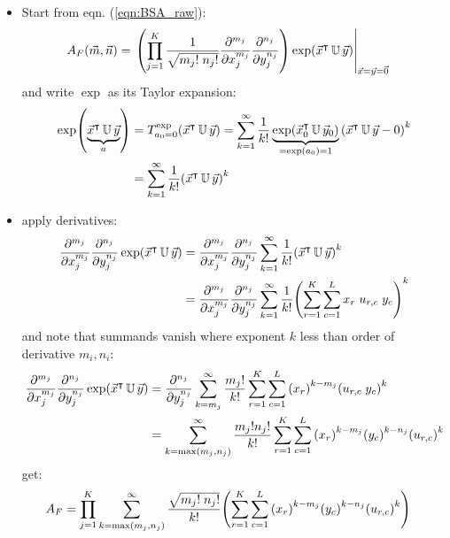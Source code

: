 \documentclass[
	english,
	a4paper,
	fontsize=10pt,
	parskip=half,
	titlepage=true,
	DIV=12,
	final
]{scrreprt}
\newcommand*{\transp}{\ensuremath{^\intercal}}
\begin{document}
\begin{itemize}
\item Start from eqn. (\ref{eqn:BSA_raw}):
\begin{align*}
	A_F(\vec{m}, \vec{n})
&=
	\eval{\qty(
		\prod_{j=1}^{K}
			\frac
				{1}
				{\sqrt{m_j! \; n_j!}}
			\pdv[m_j]{x_j}
			\pdv[n_j]{y_j}
		) \exp(\vec{x}\transp \, \mathbb{U} \, \vec{y})
	}_{\vec{x} = \vec{y} = \vec{0}}
\end{align*}
and write $\exp$ as its Taylor expansion:
\begin{align}
	\exp
	( \underbrace{\vec{x}\transp \, \mathbb{U} \, \vec{y}}_{a} )
&=
	T_{a_0 = 0}^{\exp} ( \vec{x}\transp \, \mathbb{U} \, \vec{y} )
=
	\sum_{k=1}^{\infty}
		\frac{1}{k!}
		\underbrace{ 
			\exp( \vec{x}_0\transp \, \mathbb{U} \, \vec{y}_0 )
		}_{=\exp(a_0) = 1}
		\qty( \vec{x}\transp \, \mathbb{U} \, \vec{y} - 0 )^{k}
	\\
&=
	\sum_{k=1}^{\infty}
		\frac{1}{k!}
		\qty( \vec{x}\transp \, \mathbb{U} \, \vec{y} )^{k}
\end{align}

\item apply derivatives:
\begin{align}
	\pdv[m_j]{x_j}
	\pdv[n_j]{y_j}
	\exp(\vec{x}\transp \, \mathbb{U} \, \vec{y})
&=
	\pdv[m_j]{x_j}
	\pdv[n_j]{y_j}
	\sum_{k=1}^{\infty}
		\frac{1}{k!}
		\qty( \vec{x}\transp \, \mathbb{U} \, \vec{y} )^{k}
	\\
&=
	\pdv[m_j]{x_j}
	\pdv[n_j]{y_j}
	\sum_{k=1}^{\infty}
		\frac{1}{k!}
		\qty( 
			\sum_{r=1}^{K}
			\sum_{c=1}^{L}
			x_r \; u_{r,c} \; y_c
		)^{k}
\end{align}
and note that summands vanish where exponent $k$ less than order of derivative $m_i, n_i$:
\begin{align}
	\pdv[m_j]{x_j}
	\pdv[n_j]{y_j}
	\exp(\vec{x}\transp \, \mathbb{U} \, \vec{y})
&=
	\pdv[n_j]{y_j}
	\sum^{\infty}_{k=m_j}
		\frac{m_j !}{k!}
			\sum_{r=1}^{K}
			\sum_{c=1}^{L}
		\qty(x_r)^{k - m_j}
		\qty(u_{r,c} \; y_c)^{k}
	\\
&=
	\sum^{\infty}_{k=\max(m_j, n_j)}
		\frac{m_j ! n_j !}{k!}
			\sum_{r=1}^{K}
			\sum_{c=1}^{L}
				\qty(x_r)^{k - m_j}
				\qty(y_c)^{k - n_j}
				\qty(u_{r,c})^{k}
\end{align}
get:
\begin{align}
	A_F
&=
	\prod_{j=1}^{K}
	\sum_{k=\max(m_j, n_j)}^{\infty}
		\frac
			{\sqrt{m_j! \; n_j!}}
			{k!}
		\qty( 
			\sum_{r=1}^{K}
			\sum_{c=1}^{L}
				\qty(x_r)^{k - m_j}
				\qty(y_c)^{k - n_j}
				\qty(u_{r,c})^{k}
		)
\end{align}


\end{itemize}
\end{document}
